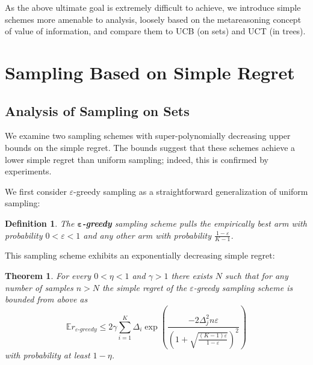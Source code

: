 \documentclass[letterpaper]{article}
\newcommand {\IE} {\ensuremath {\mathbb{E}}}
\newtheorem{dfn}{Definition}
\newtheorem{thm}{Theorem}
\begin{document}
As the above ultimate goal is extremely difficult
to achieve, we introduce
simple schemes more amenable to analysis, loosely based on the metareasoning
concept of value of information, and compare
them to UCB (on sets) and UCT (in trees).


\section{Sampling Based on Simple Regret}
\label{sec:results}

\subsection{Analysis of Sampling on Sets}
\label{sec:sampling-on-sets}


We examine two sampling schemes with super-polynomially
decreasing upper bounds on the simple regret. The bounds
suggest that these schemes achieve a lower simple regret
than uniform sampling; indeed, this is confirmed
by experiments. 

We first consider $\varepsilon$-greedy sampling as a straightforward
generalization of uniform sampling:
\begin{dfn} The \textbf{$\mathbf{\varepsilon}$-greedy} sampling scheme
pulls the empirically best arm with probability
$0<\varepsilon<1$ and any other
arm with probability $\frac {1-\varepsilon} {K-1}$. 
\end{dfn}
This sampling scheme exhibits an exponentially decreasing simple regret:
\begin{thm} For every $0<\eta<1$  and $\gamma>1$ there exists $N$ such that for
  any number of samples $n>N$ the simple regret of the  $\varepsilon$-greedy
sampling scheme is  bounded from above as
\begin{equation}
\IE r_{\varepsilon\mbox{-}greedy}\le 2\gamma \sum_{i=1}^K\Delta_i\exp\left(\frac {-2\Delta_j^2n\varepsilon}
  {\left(1+\sqrt{\frac {(K-1)\varepsilon}
        {1-\varepsilon}}\right)^2}\right)
\end{equation}
with probability at least $1-\eta$.
\end{thm}
\end{document}
